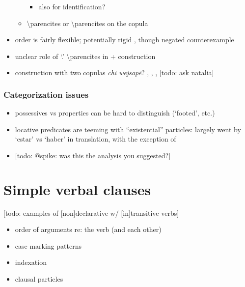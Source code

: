 \documentclass{memoir}
\begin{document}
\begin{itemize}
\begin{itemize}
    \begin{itemize}
    \tightlist
    \item
      also for identification? 
    \end{itemize}
  \item
     \textbackslash parencites or 
    \textbackslash parencites on the copula
  \end{itemize}
\item
  order is fairly flexible; potentially rigid
  \textsubscript{} \textsubscript{}
  , though negated counterexample 
\item
  unclear role of  `.'
  \textbackslash parencites in  + 
  construction
\item
  construction with two copulas \emph{chi wejsapë}?
  , ,
  ,  {[}todo: ask natalia{]}
\end{itemize}

\subsection{Categorization issues}

\begin{itemize}
\tightlist
\item
  possessives vs properties can be hard to distinguish (`footed', etc.)
\item
  locative predicates are teeming with ``existential'' particles:
  largely went by `estar' vs `haber' in translation, with the exception
  of 
\item
   {[}todo: @spike: was this the
  analysis you suggested?{]}
\end{itemize}

\chapter{\texorpdfstring{Simple verbal clauses
\label{simpleverb}}{Simple verbal clauses }}

{[}todo: examples of {[}non{]}declarative w/ {[}in{]}transitive verbs{]}

\begin{itemize}
\tightlist
\item
  order of arguments re: the verb (and each other)
\item
  case marking patterns
\item
  indexation
\item
  clausal particles
\end{itemize}
\end{document}
